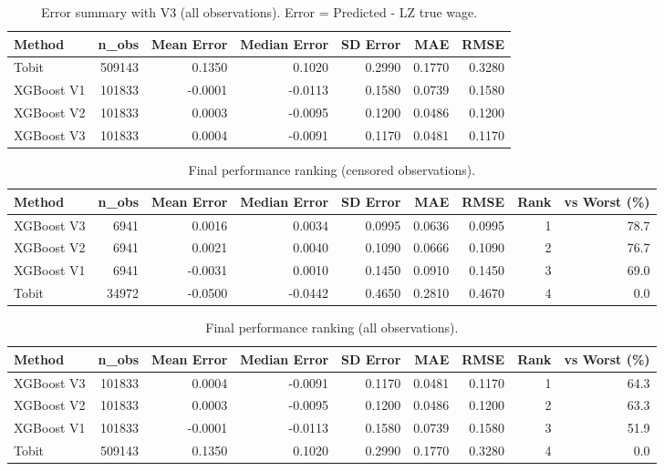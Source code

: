 \documentclass{article}
\begin{document}
\begin{table}[H]
\centering
\begin{tabular}{lrrrrrr}
\toprule
Method & n\_obs & Mean Error & Median Error & SD Error & MAE & RMSE \\
\midrule
Tobit      & 509143 &  0.1350 &  0.1020  & 0.2990 & 0.1770 & 0.3280 \\
XGBoost V1 & 101833 & -0.0001 & -0.0113  & 0.1580 & 0.0739 & 0.1580 \\
XGBoost V2 & 101833 &  0.0003 & -0.0095  & 0.1200 & 0.0486 & 0.1200 \\
XGBoost V3 & 101833 &  0.0004 & -0.0091  & 0.1170 & 0.0481 & 0.1170 \\
\bottomrule
\end{tabular}
\caption{Error summary with V3 (all observations). Error = Predicted - LZ true wage.}
\label{tab:error_summary_v3_all}
\end{table}

\begin{table}[H]
\centering
\begin{tabular}{lrrrrrrrr}
\toprule
Method & n\_obs & Mean Error & Median Error & SD Error & MAE & RMSE & Rank & vs Worst (\%) \\
\midrule
XGBoost V3 & 6941  &  0.0016 &  0.0034 & 0.0995 & 0.0636 & 0.0995 & 1 & 78.7 \\
XGBoost V2 & 6941  &  0.0021 &  0.0040 & 0.1090 & 0.0666 & 0.1090 & 2 & 76.7 \\
XGBoost V1 & 6941  & -0.0031 &  0.0010 & 0.1450 & 0.0910 & 0.1450 & 3 & 69.0 \\
Tobit      & 34972 & -0.0500 & -0.0442 & 0.4650 & 0.2810 & 0.4670 & 4 & 0.0 \\
\bottomrule
\end{tabular}
\caption{Final performance ranking (censored observations).}
\label{tab:ranking_v3_censored}
\end{table}

\begin{table}[H]
\centering
\begin{tabular}{lrrrrrrrr}
\toprule
Method & n\_obs & Mean Error & Median Error & SD Error & MAE & RMSE & Rank & vs Worst (\%) \\
\midrule
XGBoost V3 & 101833 &  0.0004 & -0.0091 & 0.1170 & 0.0481 & 0.1170 & 1 & 64.3 \\
XGBoost V2 & 101833 &  0.0003 & -0.0095 & 0.1200 & 0.0486 & 0.1200 & 2 & 63.3 \\
XGBoost V1 & 101833 & -0.0001 & -0.0113 & 0.1580 & 0.0739 & 0.1580 & 3 & 51.9 \\
Tobit      & 509143 &  0.1350 &  0.1020 & 0.2990 & 0.1770 & 0.3280 & 4 & 0.0 \\
\bottomrule
\end{tabular}
\caption{Final performance ranking (all observations).}
\label{tab:ranking_v3_all}
\end{table}
\end{document}
